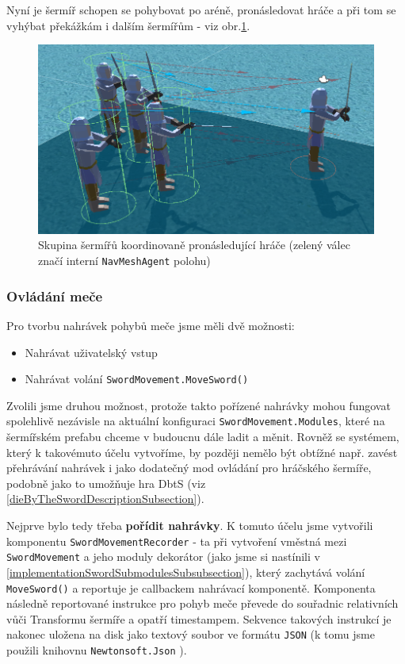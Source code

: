 Nyní je šermíř schopen se pohybovat po aréně, pronásledovat hráče a při tom se vyhýbat překážkám i dalším šermířům - viz obr.\ref{obr05:demogameAiNavigation}.

\begin{figure}[h!]\centering
  \center
  \includegraphics[width=120mm]{../img/demogameAiNavigation.png}
  \caption{Skupina šermířů koordinovaně pronásledující hráče (zelený válec značí interní \texttt{NavMeshAgent} polohu)}
  \label{obr05:demogameAiNavigation}
\end{figure} 


\subsubsection*{Ovládání meče}

Pro tvorbu nahrávek pohybů meče jsme měli dvě možnosti:
\begin{itemize}
  \item Nahrávat uživatelský vstup
  \item Nahrávat volání \texttt{SwordMovement.MoveSword()}
\end{itemize}

Zvolili jsme druhou možnost, protože takto pořízené nahrávky mohou fungovat spolehlivě nezávisle na aktuální konfiguraci \texttt{SwordMovement.Modules}, které na šermířském prefabu chceme v budoucnu dále ladit a měnit. Rovněž se systémem, který k takovémuto účelu vytvoříme, by později nemělo být obtížné např. zavést přehrávání nahrávek i jako dodatečný mod ovládání pro hráčského šermíře, podobně jako to umožňuje hra \acl{DbtS} (viz \ref{dieByTheSwordDescriptionSubsection}).

\bigbreak

Nejprve bylo tedy třeba \textbf{pořídit nahrávky}. K tomuto účelu jsme vytvořili komponentu \texttt{SwordMovementRecorder} - ta při vytvoření vměstná mezi \texttt{SwordMovement} a jeho moduly dekorátor (jako jsme si nastínili v \ref{implementationSwordSubmodulesSubsubsection}), který zachytává volání \texttt{MoveSword()} a reportuje je callbackem nahrávací komponentě. Komponenta následně reportované instrukce pro pohyb meče převede do souřadnic relativních vůči Transformu šermíře a opatří timestampem. Sekvence takových instrukcí je nakonec uložena na disk jako textový soubor ve formátu \texttt{JSON} (k tomu jsme použili knihovnu \texttt{Newtonsoft.Json} \cite{NewtonsoftJson}).

